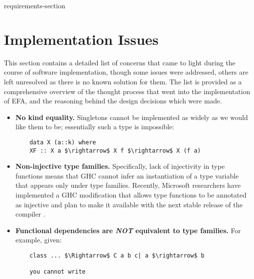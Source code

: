 \documentclass[journal,12pt,onecolumn,draftclsnofoot]{article}
\begin{document}
 {requirements-section}

\section{Implementation Issues}

This section contains a detailed list of concerns that came to light during the 
course of software implementation, though some issues were addressed, others 
are left unresolved as there is no known solution for them. The list is 
provided as a comprehensive overview of the thought process that went into the 
implementation of EFA, and the reasoning behind the design decisions which were 
made.

\begin{itemize}
    \item \textbf{No kind equality.} Singletons cannot be implemented as widely 
    as we would like them to be; essentially such a type is impossible:
    \begin{lstlisting}
    data X (a::k) where
    XF :: X a $\rightarrow$ X f $\rightarrow$ X (f a)
    \end{lstlisting}
    \item \textbf{Non-injective type families.} Specifically, lack of 
    injectivity in type functions means that GHC cannot infer an instantiation 
    of a type variable that appears only under type families. Recently, 
    Microsoft researchers have implemented a GHC modification that allows type 
    functions to be annotated as injective and plan to make it available with 
    the next stable release of the compiler \cite{microsoft}.
    \item \textbf{Functional dependencies are \textit{NOT} equivalent to type 
        families.} For example, given:
    \begin{lstlisting}
    class ... $\Rightarrow$ C a b c| a $\rightarrow$ b
    
    you cannot write
    

\end{lstlisting}
\end{itemize}
\end{document}
